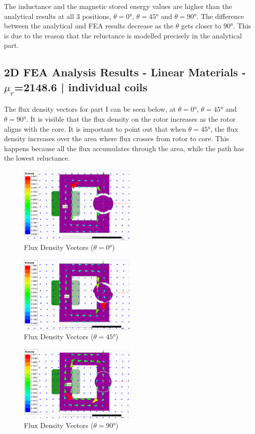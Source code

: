 \documentclass[a4paper, 11pt]{article}
\begin{document}
The inductance and the magnetic stored energy values are higher than the analytical results at all 3 positions, $\theta=\ang{0}$, $\theta=\ang{45}$ and $\theta=\ang{90}$. The difference between the analytical and FEA results decrease as the $\theta$ gets closer to $\ang{90}$. This is due to the reason that the reluctance is modelled precisely in the analytical part. 

\subsection{2D FEA Analysis Results - Linear Materials - $\mu_r$=2148.6 | individual coils}
The flux density vectors for part I can be seen below, at $\theta=\ang{0}$, $\theta=\ang{45}$ and $\theta=\ang{90}$. It is visible that the flux density on the rotor increases as the rotor aligns with the core. It is important to point out that when $\theta=\ang{45}$, the flux density increases over the area where flux crosses from rotor to core. This happens because  all the flux accumulates through the area, while the path has the lowest reluctance.

\begin{figure}[h!]
\centering
\includegraphics[width=0.5\textwidth]{Q2a2-0.png}
\caption{Flux Density Vectors ($\theta=\ang{0}$)}
\end{figure}
\begin{figure}[h!]
\centering
\includegraphics[width=0.5\textwidth]{Q2a2-45.png}
\caption{Flux Density Vectors ($\theta=\ang{45}$)}
\end{figure}
\begin{figure}[h!]
\centering
\includegraphics[width=0.5\textwidth]{Q2a2-90.png}
\caption{Flux Density Vectors ($\theta=\ang{90}$)}
\end{figure}
\end{document}
